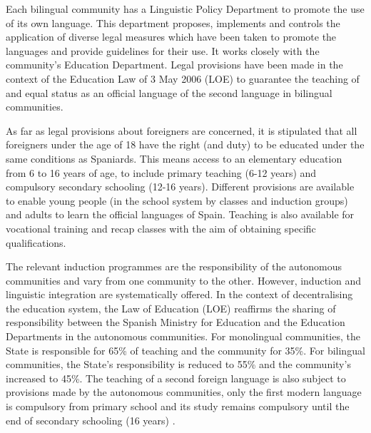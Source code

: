 \begin{multicols}{2}

Each bilingual community has a Linguistic Policy Department to promote the use of its own language. This department proposes, implements and controls the application of diverse legal measures which have been taken to promote the languages and provide guidelines for their use. It works closely with the community’s Education Department. Legal provisions have been made in the context of the Education Law of 3 May 2006 (LOE) to guarantee the teaching of and equal status as an official language of the second language in bilingual communities.


As far as legal provisions about foreigners are concerned, it is stipulated that all foreigners under the age of 18 have the right (and duty) to be educated under the same conditions as Spaniards. This means access to an elementary education from 6 to 16 years of age, to include primary teaching (6-12 years) and compulsory secondary schooling (12-16 years). Different provisions are available to enable young people (in the school system by classes and induction groups) and adults to learn the official languages of Spain. Teaching is also available for vocational training and recap classes with the aim of obtaining specific qualifications.

The relevant induction programmes are the responsibility of the autonomous communities and vary from one community to the other. However, induction and linguistic integration are systematically offered. 
In the context of decentralising the education system, the Law of Education (LOE) reaffirms the sharing of responsibility between the Spanish Ministry for Education and the Education Departments in the autonomous communities. For monolingual communities, the State is responsible for 65\% of teaching and the community for 35\%. For bilingual communities, the State’s responsibility is reduced to 55\% and the community’s increased to 45\%. The teaching of a second foreign language is also subject to provisions made by the autonomous communities, only the first modern language is compulsory from primary school and its study remains compulsory until the end of secondary schooling (16 years) \cite{Efni1}.


\end{multicols}
